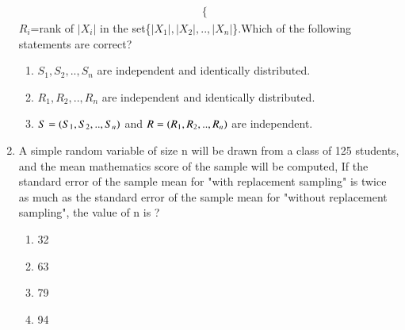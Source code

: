 \begin{enumerate}[label=\thesection.\arabic*.,ref=\thesection.\theenumi]
\begin{align}
\begin{cases}
\end{cases}
\end{align}
$R_{i}$=rank of $|X_{i}|$ in the set\{$|X_{1}|,|X_{2}|,..,|X_{n}|$\}.Which of the following statements are correct?
\begin{enumerate}
\item $S_{1},S_{2},..,S_{n}$ are independent and identically distributed.
\item $R_{1},R_{2},..,R_{n}$ are independent and identically distributed.
\item $S=\left(S_{1},S_{2},..,S_{n}\right)$ and $R=\left( R_{1},R_{2},..,R_{n}\right)$ are independent.
\end{enumerate}
%
\solution

%
%
\item A simple random variable of size n will be drawn from a class of 125 students, and the mean mathematics score of the sample will be computed, If the standard error of the sample mean for "with replacement sampling" is twice as much as the standard error of the sample mean for "without replacement sampling", the value of n is ? 
	\begin{enumerate}
	\item 32
	\item 63
	\item 79
	\item 94
	\end{enumerate}
%
\solution



\end{enumerate}
